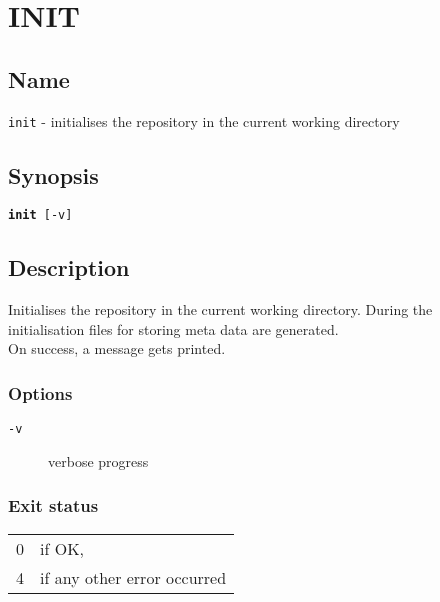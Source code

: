 \documentclass{article} %
\begin{document}
		\section*{INIT}
		\subsection*{Name}
		\texttt{init} - initialises the repository in the current working directory
		\subsection*{Synopsis}
		\texttt{\textbf{init} [-v]}
		\subsection*{Description}
		Initialises the repository in the current working directory.
		During the initialisation files for storing meta data are generated.\\
		
		\noindent On success, a message gets printed.
		\subsubsection*{Options}
		\begin{description}
			\item[\texttt{-v}] verbose progress
		\end{description}
		
		\subsubsection*{Exit status}
		\begin{tabular}{ll}
			0 &  if OK,\\ 
			4 &  if any other error occurred\\
		\end{tabular}
		\newpage
		
\end{document}
